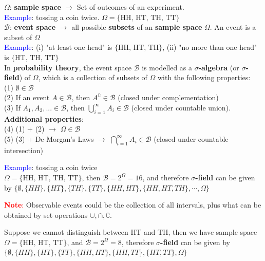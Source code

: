 \documentclass[letterpaper, 10.5pt,landscape]{article}
\begin{document}
\begin{multicols*}{3}
$\Omega$: \textbf{sample space} $\rightarrow$ Set of outcomes of an experiment.\\
\textcolor{blue}{Example}: tossing a coin twice. $\Omega = \{\text{HH, HT, TH, TT}\}$ \\

\vspace{5pt}
$\mathcal{B}$: \textbf{event space} $\rightarrow$ all possible \textbf{subsets} of an \textbf{sample space} $\Omega$. An event is a subset of $\Omega$ \\
\textcolor{blue}{Example}: (i) "at least one head" is $\{\text{HH, HT, TH} \}$, (ii) "no more than one head" is $\{\text{HT, TH, TT} \}$ \\
\vspace{3pt}
In \textbf{probability theory}, the event space $\mathcal{B}$ is modelled as a \textbf{$\sigma$-algebra} (or\textbf{ $\sigma$-field}) of $\Omega$, which is a collection of subsets of $\Omega$ with the following properties: \\
(1) \( \boxed{\emptyset \in \mathcal{B}} \) \\
(2) If an event \( \boxed{A \in \mathcal{B}} \), then \(\boxed{A^{\complement} \in \mathcal{B}} \) (closed under complementation) \\
(3) If \( \boxed{A_{1}, A_{2},... \in \mathcal{B}} \), then \( \boxed{\bigcup \limits_{i=1}^{\infty} A_{i} \in \mathcal{B} }\) (closed under countable union). \\

\vspace{2pt}
\textbf{Additional properties}:\\
(4) (1) + (2) $\rightarrow$ \( \boxed{\Omega \in \mathcal{B}} \) \\
(5) (3) + De-Morgan's Laws $\rightarrow$ \( \boxed{\bigcap \limits_{i=1}^{\infty} A_{i} \in \mathcal{B} }\) (closed under countable intersection)


\textcolor{blue}{Example}: tossing a coin twice \\
\(\Omega = \{\text{HH, HT, TH, TT}\}\), then \(  \mathcal{B} = 2^{\Omega} = 16\), and therefore \textbf{ $\sigma$-field} can be given by \( \{\emptyset, \{HH\}, \{HT\}, \{TH\}, \{TT\}, \{HH, HT\}, \{HH, HT, TH\}, \cdots , \Omega  \}\)

\textcolor{red}{\textbf{Note}:} Observable events could be the collection of all intervals, plus what can be obtained by set operations \(\cup, \cap, \complement \).

\vspace{3pt}
Suppose we cannot distinguish between \(\text{HT} \) and \(\text{TH}\), then we have sample space \(\Omega = \{\text{HH, HT, TT} \}\), and \(\mathcal{B} = 2^{\Omega} = 8\), therefore \textbf{ $\sigma$-field} can be given by \( \{\emptyset, \{HH\}, \{HT\}, \{TT\}, \{HH, HT\}, \{HH, TT\}, \{HT, TT\}, \Omega  \}\)


\end{multicols*}
\end{document}
